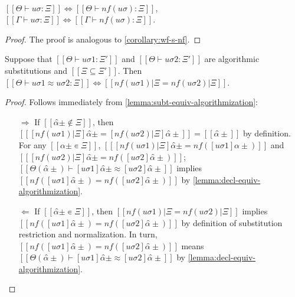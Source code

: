 \begin{corollary}
  \label{corollary:norm-subst-sig-algo}
  \hfill \\
  $[[Θ ⊢ uσ : Ξ]] \iff [[Θ ⊢ nf(uσ) : Ξ]]$,
  $[[Γ ⊢ uσ : Ξ]] \iff [[Γ ⊢ nf(uσ) : Ξ]]$.
\end{corollary}
\begin{proof}
  The proof is analogous to \cref{corollary:wf-s-nf}.
\end{proof}


\begin{lemma}
  \label{corollary:subst-subt-equiv-algorithmization}
  Suppose that $[[Θ ⊢ uσ1 : Ξ']]$ and $[[Θ ⊢ uσ2 : Ξ']]$ are algorithmic substitutions
  and $[[Ξ ⊆ Ξ']]$. 
  Then $[[Θ ⊢ uσ1 ≈ uσ2 : Ξ]] \iff [[nf(uσ1)|Ξ = nf(uσ2)|Ξ]]$.
\end{lemma}
\begin{proof}
  Follows immediately from \cref{lemma:subt-equiv-algorithmization}:
  \begin{itemize}
    \item [$\Rightarrow$]
      If $[[α̂± ∉ Ξ]]$, then $[[ [nf(uσ1)|Ξ]α̂± = [nf(uσ2)|Ξ]α̂± ]] = [[α̂±]]$ by 
      definition. 
      For any $[[α̂± ∊ Ξ]]$, 
      $[[ [nf(uσ1)|Ξ]α̂± = nf([uσ1]α̂±)]]$ and 
      $[[ [nf(uσ2)|Ξ]α̂± = nf([uσ2]α̂±) ]]$; 
      $[[Θ(α̂±) ⊢ [uσ1]α̂± ≈ [uσ2]α̂±]]$ implies
      $[[ nf([uσ1]α̂±) = nf([uσ2]α̂±) ]]$ by \cref{lemma:decl-equiv-algorithmization}.
    \item [$\Leftarrow$]
      If $[[α̂± ∊ Ξ]]$, then 
      $[[nf(uσ1)|Ξ = nf(uσ2)|Ξ]]$ implies
      $[[ nf([uσ1]α̂±) = nf([uσ2]α̂±) ]]$ by definition 
      of substitution restriction and normalization.
      In turn, $[[ nf([uσ1]α̂±) = nf([uσ2]α̂±) ]]$ means
       $[[Θ(α̂±) ⊢ [uσ1]α̂± ≈ [uσ2]α̂±]]$ by \cref{lemma:decl-equiv-algorithmization}.
  \end{itemize}
\end{proof}